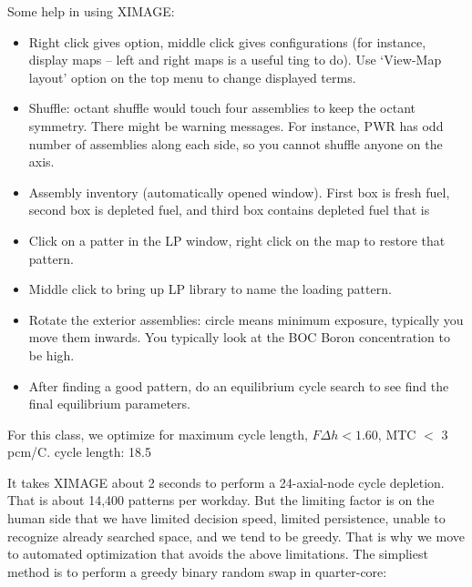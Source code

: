 \documentclass{school-22.211-notes}
\begin{document}
Some help in using XIMAGE: 

\begin{itemize}

\item Right click gives option, middle click gives configurations (for
  instance, display maps -- left and right maps is a useful ting to
  do). Use `View-Map layout' option on the top menu to change
  displayed terms.

\item Shuffle: octant shuffle would touch four assemblies to keep the
  octant symmetry. There might be warning messages. For instance, PWR
  has odd number of assemblies along each side, so you cannot shuffle
  anyone on the axis.

\item Assembly inventory (automatically opened window). First box is
  fresh fuel, second box is depleted fuel, and third box contains
  depleted fuel that is

\item Click on a patter in the LP window, right click on the map to
  restore that pattern.

\item Middle click to bring up LP library to name the loading pattern. 

\item Rotate the exterior assemblies: circle means minimum exposure,
  typically you move them inwards. You typically look at the BOC Boron
  concentration to be high.

\item After finding a good pattern, do an equilibrium cycle search to
  see find the final equilibrium parameters.
\end{itemize}

For this class, we optimize for maximum cycle length, $F \Delta h <
1.60$, MTC $<$ 3 pcm/C. cycle length: 18.5 

\clearpage


It takes XIMAGE about 2 seconds to perform a 24-axial-node cycle
depletion. That is about 14,400 patterns per workday. But the limiting
factor is on the human side that we have limited decision speed,
limited persistence, unable to recognize already searched space, and
we tend to be greedy. That is why we move to automated optimization
that avoids the above limitations. The simpliest method is to perform
a greedy binary random swap in quarter-core:
\end{document}
